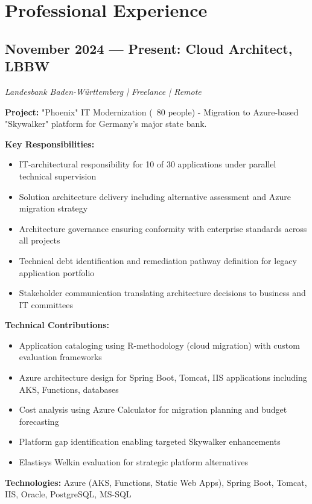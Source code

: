 \documentclass[11pt,a4paper]{article}
\begin{document}
\newpage

\section{Professional Experience}

\subsection{November 2024 — Present: Cloud Architect, LBBW}
\textit{Landesbank Baden-Württemberg | Freelance | Remote}

\textbf{Project:} "Phoenix" IT Modernization (~80 people) - Migration to Azure-based "Skywalker" platform for Germany's major state bank.

\textbf{Key Responsibilities:}
\begin{itemize}[leftmargin=12pt,topsep=0pt,itemsep=0pt]
\item IT-architectural responsibility for 10 of 30 applications under parallel technical supervision
\item Solution architecture delivery including alternative assessment and Azure migration strategy
\item Architecture governance ensuring conformity with enterprise standards across all projects
\item Technical debt identification and remediation pathway definition for legacy application portfolio
\item Stakeholder communication translating architecture decisions to business and IT committees
\end{itemize}

\textbf{Technical Contributions:}
\begin{itemize}[leftmargin=12pt,topsep=0pt,itemsep=0pt]
\item Application cataloging using R-methodology (cloud migration) with custom evaluation frameworks
\item Azure architecture design for Spring Boot, Tomcat, IIS applications including AKS, Functions, databases
\item Cost analysis using Azure Calculator for migration planning and budget forecasting
\item Platform gap identification enabling targeted Skywalker enhancements
\item Elastisys Welkin evaluation for strategic platform alternatives
\end{itemize}

\textbf{Technologies:} Azure (AKS, Functions, Static Web Apps), Spring Boot, Tomcat, IIS, Oracle, PostgreSQL, MS-SQL
\end{document}
